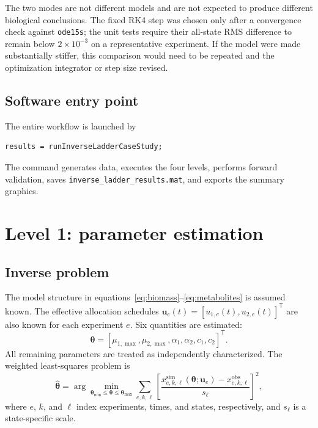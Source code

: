 \documentclass[11pt,a4paper]{article}
\newcommand{\vect}[1]{\boldsymbol{#1}}
\begin{document}
The two modes are not different models and are not expected to produce
different biological conclusions. The fixed RK4 step was chosen only after a
convergence check against \texttt{ode15s}; the unit tests require their
all-state RMS difference to remain below \(2\times10^{-3}\) on a representative
experiment. If the model were made substantially stiffer, this comparison
would need to be repeated and the optimization integrator or step size revised.

\subsection{Software entry point}

The entire workflow is launched by
\begin{lstlisting}[style=matlabstyle]
results = runInverseLadderCaseStudy;
\end{lstlisting}
The command generates data, executes the four levels, performs forward
validation, saves \texttt{inverse\_ladder\_results.mat}, and exports the
summary graphics.

\section{Level 1: parameter estimation}

\subsection{Inverse problem}

The model structure in equations~\eqref{eq:biomass}--\eqref{eq:metabolites}
is assumed known. The effective allocation schedules
\(\vect{u}_e(t)=[u_{1,e}(t),u_{2,e}(t)]^{\mathsf T}\) are also known for each
experiment \(e\). Six quantities are estimated:
\begin{equation}
  \vect{\theta} =
  [\mu_{1,\max},\mu_{2,\max},\alpha_1,\alpha_2,c_1,c_2]^{\mathsf T}.
\end{equation}
All remaining parameters are treated as independently characterized. The
weighted least-squares problem is
\begin{equation}
  \hat{\vect{\theta}} =
  \arg\min_{\vect{\theta}_{\min}\le\vect{\theta}\le\vect{\theta}_{\max}}
  \sum_{e,k,\ell}
  \left[
    \frac{x^{\mathrm{sim}}_{e,k,\ell}(\vect{\theta};\vect{u}_e)
          -x^{\mathrm{obs}}_{e,k,\ell}}
         {s_{\ell}}
  \right]^2,
\end{equation}
where \(e\), \(k\), and \(\ell\) index experiments, times, and states,
respectively, and \(s_{\ell}\) is a state-specific scale.
\end{document}
